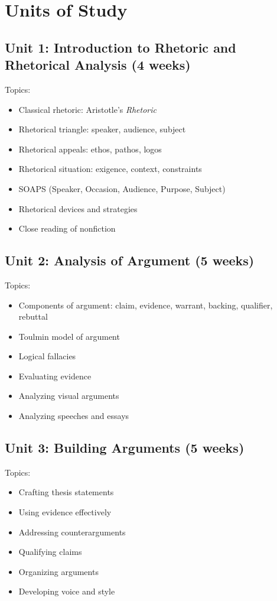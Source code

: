 \documentclass[12pt,oneside]{book}
\begin{document}
\section{Units of Study}
\subsection*{Unit 1: Introduction to Rhetoric and Rhetorical Analysis (4 weeks)}
Topics:
\begin{itemize}[leftmargin=2em]
    \item Classical rhetoric: Aristotle's \emph{Rhetoric}
    \item Rhetorical triangle: speaker, audience, subject
    \item Rhetorical appeals: ethos, pathos, logos
    \item Rhetorical situation: exigence, context, constraints
    \item SOAPS (Speaker, Occasion, Audience, Purpose, Subject)
    \item Rhetorical devices and strategies
    \item Close reading of nonfiction
\end{itemize}

\subsection*{Unit 2: Analysis of Argument (5 weeks)}
Topics:
\begin{itemize}[leftmargin=2em]
    \item Components of argument: claim, evidence, warrant, backing, qualifier, rebuttal
    \item Toulmin model of argument
    \item Logical fallacies
    \item Evaluating evidence
    \item Analyzing visual arguments
    \item Analyzing speeches and essays
\end{itemize}

\subsection*{Unit 3: Building Arguments (5 weeks)}
Topics:
\begin{itemize}[leftmargin=2em]
    \item Crafting thesis statements
    \item Using evidence effectively
    \item Addressing counterarguments
    \item Qualifying claims
    \item Organizing arguments
    \item Developing voice and style
\end{itemize}
\end{document}
